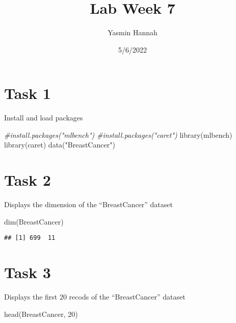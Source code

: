 \documentclass[
]{article}
\title{Lab Week 7}
\author{Yasmin Hannah}
\date{5/6/2022}
\newenvironment{Shaded}{\begin{snugshade}}{\end{snugshade}}
\newcommand{\CommentTok}[1]{\textcolor[rgb]{0.56,0.35,0.01}{\textit{#1}}}
\newcommand{\DecValTok}[1]{\textcolor[rgb]{0.00,0.00,0.81}{#1}}
\newcommand{\FunctionTok}[1]{\textcolor[rgb]{0.00,0.00,0.00}{#1}}
\newcommand{\NormalTok}[1]{#1}
\newcommand{\StringTok}[1]{\textcolor[rgb]{0.31,0.60,0.02}{#1}}
\begin{document}
\maketitle

\hypertarget{task-1}{%
\section{Task 1}\label{task-1}}

Install and load packages

\begin{Shaded}
\begin{Highlighting}[]
\CommentTok{\#install.packages("mlbench")}
\CommentTok{\#install.packages("caret")}
\FunctionTok{library}\NormalTok{(mlbench)}
\FunctionTok{library}\NormalTok{(caret)}
\FunctionTok{data}\NormalTok{(}\StringTok{"BreastCancer"}\NormalTok{)}
\end{Highlighting}
\end{Shaded}

\hypertarget{task-2}{%
\section{Task 2}\label{task-2}}

Displays the dimension of the ``BreastCancer'' dataset

\begin{Shaded}
\begin{Highlighting}[]
\FunctionTok{dim}\NormalTok{(BreastCancer)}
\end{Highlighting}
\end{Shaded}

\begin{verbatim}
## [1] 699  11
\end{verbatim}

\hypertarget{task-3}{%
\section{Task 3}\label{task-3}}

Displays the first 20 recods of the ``BreastCancer'' dataset

\begin{Shaded}
\begin{Highlighting}[]
\FunctionTok{head}\NormalTok{(BreastCancer, }\DecValTok{20}\NormalTok{)}
\end{Highlighting}
\end{Shaded}
\end{document}
